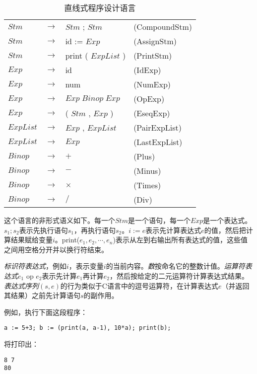 \documentclass[cn,11pt,chinese]{elegantbook}
\begin{document}
\renewcommand\tablename{文法}
\begin{table}[htbp]
  \centering
  \begin{tabular}{llll}
  $Stm$ & $\rightarrow$ & $Stm$ ; $Stm$ & (CompoundStm) \\
  $Stm$ & $\rightarrow$ & id := $Exp$ & (AssignStm) \\
  $Stm$ & $\rightarrow$ & print ( $ExpList$ ) & (PrintStm) \\
  $Exp$ & $\rightarrow$ & id & (IdExp) \\
  $Exp$ & $\rightarrow$ & num & (NumExp) \\
  $Exp$ & $\rightarrow$ & $Exp \; Binop \; Exp$ & (OpExp) \\
  $Exp$ & $\rightarrow$ & ( $Stm$ , $Exp$ ) & (EseqExp) \\
  $ExpList$ & $\rightarrow$ & $Exp$ , $ExpList$ & (PairExpList) \\
  $ExpList$ & $\rightarrow$ & $Exp$ & (LastExpList) \\
  $Binop$ & $\rightarrow$ & $+$ & (Plus) \\
  $Binop$ & $\rightarrow$ & $-$ & (Minus) \\
  $Binop$ & $\rightarrow$ & $\times$ & (Times) \\
  $Binop$ & $\rightarrow$ & $/$ & (Div) \\
  \end{tabular}
  \caption{直线式程序设计语言}\label{grammar:1}
\end{table}
\renewcommand\tablename{表}

这个语言的非形式语义如下。每一个$Stm$是一个语句，每一个$Exp$是一个表达式。$s_1;s_2$表示先执行语句$s_1$，再执行语句$s_2$。$i := e$表示先计算表达式$e$的值，然后把计算结果赋给变量$i$。print($e_1,e_2,\cdots,e_n$)表示从左到右输出所有表达式的值，这些值之间用空格分开并以换行符结束。

\textit{标识符表达式}，例如$i$，表示变量$i$的当前内容。\textit{数}按命名它的整数计值。\textit{运算符表达式}$e_1$ op $e_2$表示先计算$e_1$再计算$e_2$，然后按给定的二元运算符计算表达式结果。\textit{表达式序列}$(s,e)$的行为类似于C语言中的逗号运算符，在计算表达式$e$（并返回其结果）之前先计算语句$s$的副作用。

例如，执行下面这段程序：

\begin{verbatim}
a := 5+3; b := (print(a, a-1), 10*a); print(b);  
\end{verbatim}

将打印出：

\begin{verbatim}
8 7
80
\end{verbatim}
\end{document}
